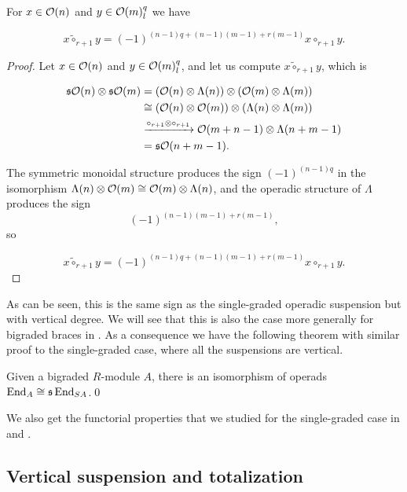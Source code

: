 \documentclass[Thesis.tex]{subfiles}
\begin{document}
\begin{lem}
For $x\in{\mathcal O}(n)$ and $y\in{\mathcal O}(m)^{q}_l$ we have

\begin{equation}\label{sign}
x\tilde{\circ}_{r+1}y=(-1)^{(n-1)q+(n-1)(m-1)+r(m-1)}x\circ_{r+1} y.
\end{equation}

\end{lem}

\begin{proof}
Let $x\in{\mathcal O}(n)$ and $y\in{\mathcal O}(m)^{q}_l$, and let us compute $x\tilde{\circ}_{r+1} y$, which is

\begin{align*}
\mathfrak{s}{\mathcal O}(n)\otimes\mathfrak{s}{\mathcal O}(m)&=({\mathcal O}(n)\otimes\Lambda(n))\otimes ({\mathcal O}(m)\otimes\Lambda(m))\\
&\cong ({\mathcal O}(n)\otimes {\mathcal O}(m))\otimes (\Lambda(n)\otimes \Lambda(m))\\
&\xrightarrow{\circ_{r+1}\otimes\circ_{r+1}} {\mathcal O}(m+n-1)\otimes \Lambda(n+m-1)\\
&=\mathfrak{s}{\mathcal O}(n+m-1).
\end{align*}

The symmetric monoidal structure produces the sign $(-1)^{(n-1)q}$ in the isomorphism $\Lambda(n)\otimes {\mathcal O}(m)\cong{\mathcal O}(m)\otimes\Lambda(n)$, and the operadic structure of $\Lambda$ produces the sign \[(-1)^{(n-1)(m-1)+r(m-1)},\] so 

\[
x\tilde{\circ}_{r+1}y=(-1)^{(n-1)q+(n-1)(m-1)+r(m-1)}x\circ_{r+1} y.
\]

\end{proof}
As can be seen, this is the same sign as the single-graded operadic suspension but with vertical degree. We will see that this is also the case more generally for bigraded braces in . As a consequence we have the following theorem with similar proof to the single-graded case, where all the suspensions are vertical.
\begin{thm}
Given a bigraded $R$-module $A$, there is an isomorphism of operads $\operatorname{End}_{ A}\cong \mathfrak{s}\operatorname{End}_{SA}$.\qed
\end{thm}

We also get the functorial properties that we studied for the single-graded case in  and .

\subsection{Vertical suspension and totalization} 
\end{document}
